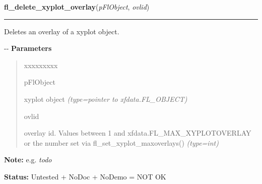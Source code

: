     \label{xformslib:flxyplot:fl_delete_xyplot_overlay}

    \vspace{0.5ex}

\hspace{.8\funcindent}\begin{boxedminipage}{\funcwidth}

    \raggedright \textbf{fl\_delete\_xyplot\_overlay}(\textit{pFlObject}, \textit{ovlid})

    \vspace{-1.5ex}

    \rule{\textwidth}{0.5\fboxrule}
\setlength{\parskip}{2ex}

Deletes an overlay of a xyplot object.

-{}-
\setlength{\parskip}{1ex}
      \textbf{Parameters}
      \vspace{-1ex}

      \begin{quote}
        \begin{Ventry}{xxxxxxxxx}

          \item[pFlObject]


xyplot object
            {\it (type=pointer to xfdata.FL\_OBJECT)}

          \item[ovlid]


overlay id. Values between 1 and xfdata.FL\_MAX\_XYPLOTOVERLAY or the
number set via fl\_set\_xyplot\_maxoverlays()
            {\it (type=int)}

        \end{Ventry}

      \end{quote}

\textbf{Note:} 
e.g. \emph{todo}


\textbf{Status:} 
Untested + NoDoc + NoDemo = NOT OK


    \end{boxedminipage}

    \label{xformslib:flxyplot:fl_set_xyplot_interpolate}

    \vspace{0.5ex}

